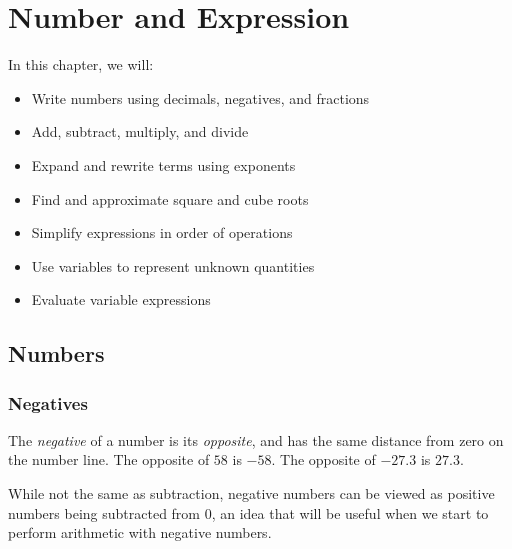 \chapter{Number and Expression}

\begin{summary}
In this chapter, we will:
\begin{itemize}
    \item Write numbers using decimals, negatives, and fractions
    \item Add, subtract, multiply, and divide
    \item Expand and rewrite terms using exponents
    \item Find and approximate square and cube roots
    \item Simplify expressions in order of operations 
    \item Use variables to represent unknown quantities
    \item Evaluate variable expressions
    
\end{itemize}
\end{summary}

\newpage 
\section{Numbers}

\subsection{Negatives}
\begin{definition}[Negative]
The \emph{negative} of a number is its \emph{opposite}, and has the same distance from zero on the number line.  The opposite of \(58\) is \(-58\).  The opposite of \(-27.3\) is \(27.3\).  
\end{definition}

While not the same as subtraction, negative numbers can be viewed as positive numbers being subtracted from \(0\), an idea that will be useful when we start to perform arithmetic with negative numbers.  

